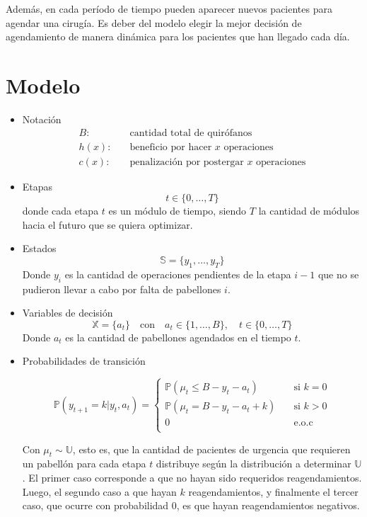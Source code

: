 \documentclass[letterpaper,10pt]{article}
\begin{document}
Además, en cada período de tiempo pueden aparecer nuevos pacientes para agendar una cirugía. Es deber del modelo elegir la mejor decisión de agendamiento de manera dinámica para los pacientes que han llegado cada día.

\section*{Modelo}
\begin{itemize}
    \item Notación
    \begin{align*}
        B: & \quad \text{cantidad total de quirófanos} \\
        h(x): & \quad \text{beneficio por hacer $x$ operaciones} \\
        c(x): & \quad \text{penalización por postergar $x$ operaciones}
    \end{align*}

    \item Etapas
    $$ t \in \{0,\dots,T\} $$
    donde cada etapa $t$ es un módulo de tiempo, siendo $T$ la cantidad de módulos hacia el futuro que se quiera optimizar.

    \item Estados
    $$ \mathds{S} = \{ y_1, \dots,   y_T\}$$ 
    Donde $y_i$ es la cantidad de operaciones pendientes de la etapa $i-1$ que no se pudieron llevar a cabo por falta de pabellones $i$.
    \item Variables de decisión
    $$ \mathds{X} = \{a_t\} \quad \text{con} \quad a_t \in \{1, \dots, B\}, \quad t \in \{0,\dots,T\}$$ 
    Donde $a_t$ es la cantidad de pabellones agendados en el tiempo $t$.
    
    \item Probabilidades de transición
    
    \[
    \mathds{P}(y_{t+1} = k | y_t, a_t) =
         \begin{cases}
            \mathds{P}(\mu_t \leq B - y_t - a_t) & \quad\text{si } k = 0 \\
            \mathds{P}(\mu_t = B - y_t - a_t + k) & \quad\text{si }  k > 0 \\
           0 & \quad\text{e.o.c }  \\
         \end{cases}
  \]

    Con $\mu_t \sim \mathds{U}$, esto es, que la cantidad de pacientes de urgencia que requieren un pabellón para cada etapa $t$ distribuye según la distribución a determinar $\mathds{U}$. El primer caso corresponde a que no hayan sido requeridos reagendamientos. Luego, el segundo caso a que hayan $k$ reagendamientos, y finalmente el tercer caso, que ocurre con probabilidad 0, es que hayan reagendamientos negativos.
    

\end{itemize}
\end{document}

